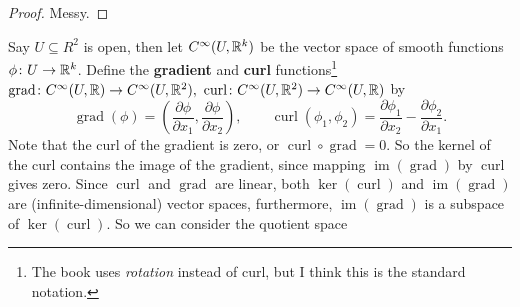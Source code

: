 \begin{proof}
    Messy.
\end{proof}
Say $U \subseteq R^2$ is open, then let $C^{\infty}(U, \mathbb{R}^k)$ be the vector space of smooth functions $\phi \colon U \to \mathbb{R}^k$. Define the \textbf{gradient} and \textbf{curl} functions\footnote{The book uses \emph{rotation} instead of curl, but I think this is the standard notation.} $\operatorname{grad}\colon C^{\infty} (U,\mathbb{R})\to C^{\infty}(U, \mathbb{R}^2), \ \operatorname{curl}\colon C^{\infty}(U,\mathbb{R}^2) \to C^{\infty}(U,\mathbb{R})$ by \[
    \operatorname{grad}(\phi) = \left( \frac{\partial \phi}{\partial x_1}, \frac{\partial \phi}{\partial x_2} \right) , \qquad \operatorname{curl}(\phi_1,\phi_2)= \frac{\partial \phi_1}{\partial x_2}-\frac{\partial \phi_2}{\partial x_1}.
\] Note that the curl of the gradient is zero, or $\operatorname{curl}\circ \operatorname{grad}=0$. So the kernel of the curl contains the image of the gradient, since mapping $\operatorname{im}(\operatorname{grad})$ by $\operatorname{curl}$ gives zero. Since $\operatorname{curl}$ and $\operatorname{grad}$ are linear, both $\ker (\operatorname{curl})$ and $\operatorname{im}(\operatorname{grad})$ are (infinite-dimensional) vector spaces, furthermore, $\operatorname{im}(\operatorname{grad})$ is a subspace of $\ker (\operatorname{curl})$. So we can consider the quotient space
